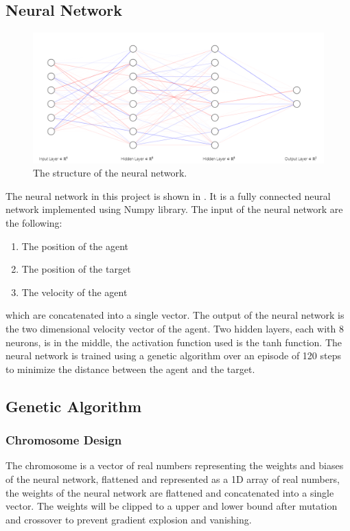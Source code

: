 \documentclass[sigconf]{acmart}
\begin{document}
\subsection{Neural Network}
\begin{figure}[H]
  \centering
  \includegraphics[width=0.95\linewidth]{imgs/NeuralNetwork.png}
  \caption{The structure of the neural network.}
  \label{fig:neural_network}
\end{figure}
The neural network in this project is shown in . It is a fully connected neural network implemented using Numpy library. The input of the neural network are the following:
\begin{enumerate}
  \item The position of the agent
  \item The position of the target
  \item The velocity of the agent
\end{enumerate}
which are concatenated into a single vector.
The output of the neural network is the two dimensional velocity vector of the agent. Two hidden layers, each with 8 neurons, is in the middle, the activation function used is the tanh function. The neural network is trained using a genetic algorithm over an episode of 120 steps to minimize the distance between the agent and the target.

\subsection{Genetic Algorithm}
\subsubsection{Chromosome Design} The chromosome is a vector of real numbers representing the weights and biases of the neural network, flattened and represented as a 1D array of real numbers, the weights of the neural network are flattened and concatenated into a single vector. The weights will be clipped to a upper and lower bound after mutation and crossover to prevent gradient explosion and vanishing.
\end{document}
